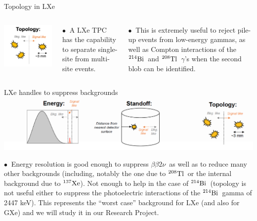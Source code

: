 \documentclass [aspectratio=169]{beamer}
\newcommand{\bbtnu}{\ensuremath{\beta\beta2\nu}}
\newcommand{\XES}{\ensuremath{{}^{137}{\rm Xe}}}
\newcommand{\TL}{\ensuremath{{}^{208}{\rm Tl}}}
\newcommand{\BI}{\ensuremath{{}^{214}{\rm Bi}}}
\begin{document}
\begin{frame}{Topology in LXe}
\begin{columns}
\includegraphics[scale=0.35]{exoTopo.png}


$\bullet~$ A LXe TPC has the capability to separate single-site from multi-site events.  

$\bullet~$ This is extremely useful to reject pile-up events from low-energy gammas, as well as Compton interactions of the  \BI\ and \TL\ $\gamma$'s when the second blob can be identified.   

\end{columns}
\end{frame}

\begin{frame}{LXe handles to suppress backgrounds}
\includegraphics[scale=0.35]{nexto-tools.png}

$\bullet~$ Energy resolution is good enough to suppress \bbtnu\ as well as to reduce many other backgrounds (including, notably the one due to \TL\ or the internal background due to \XES). Not 
enough to help in the case of \BI\ (topology is not useful either to suppress the photoelectric interactions of the \BI\ gamma of 2447 keV). This represents the ``worst case'' background for LXe (and also for GXe) and we will study it in our Research Project. 
\end{frame}
\end{document}
